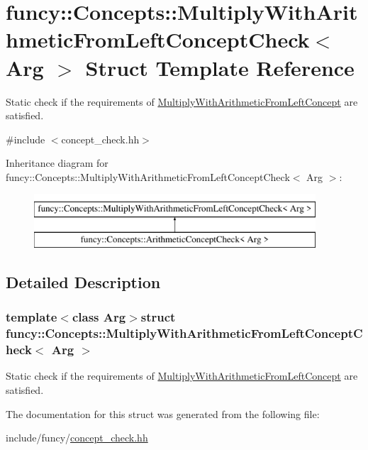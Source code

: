 \hypertarget{structfuncy_1_1Concepts_1_1MultiplyWithArithmeticFromLeftConceptCheck}{\section{funcy\-:\-:Concepts\-:\-:Multiply\-With\-Arithmetic\-From\-Left\-Concept\-Check$<$ Arg $>$ Struct Template Reference}
\label{structfuncy_1_1Concepts_1_1MultiplyWithArithmeticFromLeftConceptCheck}
}


Static check if the requirements of \hyperlink{structfuncy_1_1Concepts_1_1MultiplyWithArithmeticFromLeftConcept}{Multiply\-With\-Arithmetic\-From\-Left\-Concept} are satisfied.  




{\ttfamily \#include $<$concept\-\_\-check.\-hh$>$}

Inheritance diagram for funcy\-:\-:Concepts\-:\-:Multiply\-With\-Arithmetic\-From\-Left\-Concept\-Check$<$ Arg $>$\-:\begin{figure}[H]
\begin{center}
\leavevmode
\includegraphics[height=2.000000cm]{structfuncy_1_1Concepts_1_1MultiplyWithArithmeticFromLeftConceptCheck}
\end{center}
\end{figure}


\subsection{Detailed Description}
\subsubsection*{template$<$class Arg$>$struct funcy\-::\-Concepts\-::\-Multiply\-With\-Arithmetic\-From\-Left\-Concept\-Check$<$ Arg $>$}

Static check if the requirements of \hyperlink{structfuncy_1_1Concepts_1_1MultiplyWithArithmeticFromLeftConcept}{Multiply\-With\-Arithmetic\-From\-Left\-Concept} are satisfied. 

The documentation for this struct was generated from the following file\-:\begin{DoxyCompactItemize}
\item 
include/funcy/\hyperlink{concept__check_8hh}{concept\-\_\-check.\-hh}\end{DoxyCompactItemize}
